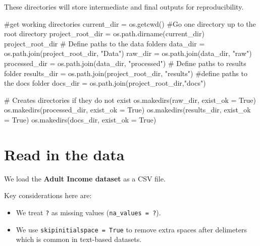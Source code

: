 \documentclass[
  letterpaper,
  DIV=11,
  numbers=noendperiod]{scrartcl}
\newenvironment{Shaded}{\begin{snugshade}}{\end{snugshade}}
\newcommand{\CommentTok}[1]{\textcolor[rgb]{0.37,0.37,0.37}{#1}}
\newcommand{\NormalTok}[1]{\textcolor[rgb]{0.00,0.23,0.31}{#1}}
\newcommand{\OperatorTok}[1]{\textcolor[rgb]{0.37,0.37,0.37}{#1}}
\newcommand{\StringTok}[1]{\textcolor[rgb]{0.13,0.47,0.30}{#1}}
\newcommand{\VariableTok}[1]{\textcolor[rgb]{0.07,0.07,0.07}{#1}}
\providecommand{\tightlist}{%
  \setlength{\itemsep}{0pt}\setlength{\parskip}{0pt}}
\begin{document}
These directories will store intermediate and final outputs for
reproducibility.

\begin{Shaded}
\begin{Highlighting}[]
\CommentTok{\#get working directories}
\NormalTok{current\_dir }\OperatorTok{=}\NormalTok{ os.getcwd() }
\CommentTok{\#Go one directory up to the root directory}
\NormalTok{project\_root\_dir }\OperatorTok{=}\NormalTok{ os.path.dirname(current\_dir) }
\NormalTok{project\_root\_dir}
\CommentTok{\# Define paths to the data folders}
\NormalTok{data\_dir }\OperatorTok{=}\NormalTok{ os.path.join(project\_root\_dir, }\StringTok{"Data"}\NormalTok{)}
\NormalTok{raw\_dir }\OperatorTok{=}\NormalTok{ os.path.join(data\_dir, }\StringTok{"raw"}\NormalTok{)}
\NormalTok{processed\_dir }\OperatorTok{=}\NormalTok{ os.path.join(data\_dir, }\StringTok{"processed"}\NormalTok{)}
\CommentTok{\# Define paths to results folder}
\NormalTok{results\_dir }\OperatorTok{=}\NormalTok{ os.path.join(project\_root\_dir, }\StringTok{"results"}\NormalTok{)}
\CommentTok{\#define paths to the docs folder}
\NormalTok{docs\_dir }\OperatorTok{=}\NormalTok{ os.path.join(project\_root\_dir,}\StringTok{"docs"}\NormalTok{)}

\CommentTok{\# Creates directories if they do not exist}
\NormalTok{os.makedirs(raw\_dir, exist\_ok }\OperatorTok{=} \VariableTok{True}\NormalTok{)}
\NormalTok{os.makedirs(processed\_dir, exist\_ok }\OperatorTok{=} \VariableTok{True}\NormalTok{)}
\NormalTok{os.makedirs(results\_dir, exist\_ok }\OperatorTok{=} \VariableTok{True}\NormalTok{)}
\NormalTok{os.makedirs(docs\_dir, exist\_ok }\OperatorTok{=} \VariableTok{True}\NormalTok{)}


\end{Highlighting}
\end{Shaded}

\section{Read in the data}\label{read-in-the-data}

We load the \textbf{Adult Income dataset} as a CSV file.

Key considerations here are:

\begin{itemize}
\tightlist
\item
  We treat \texttt{?} as missing values
  (\texttt{na\_values\ =\ \textquotesingle{}?\textquotesingle{}}).
\item
  We use \texttt{skipinitialspace\ =\ True} to remove extra spaces after
  delimeters which is common in text-based datasets.
\end{itemize}
\end{document}
